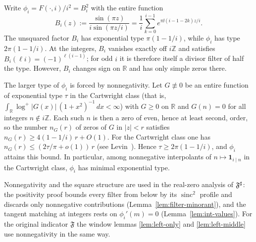 \begin{remark}\label{rem:minimal-type}
Write $\phi_i=F(\cdot,i)/i^2=B_i^2$ with the entire function
\[
B_i(z):=\frac{\sin(\pi z)}{i\sin(\pi z/i)}=\frac1i\sum_{k=0}^{i-1}e^{\pi\ii(i-1-2k)z/i}.
\]
The unsquared factor $B_i$ has exponential type $\pi(1-1/i)$, while $\phi_i$ has type $2\pi(1-1/i)$. At the integers, $B_i$ vanishes exactly off $i\mathbb Z$ and satisfies $B_i(\ell i)=(-1)^{\ell(i-1)}$; for odd $i$ it is therefore itself a divisor filter of half the type. However, $B_i$ changes sign on $\mathbb R$ and has only simple zeros there.

The larger type of $\phi_i$ is forced by nonnegativity. Let $G\not\equiv0$ be an entire function of exponential type $\tau$ in the Cartwright class (that is, $\int_{\mathbb R}\log^+|G(x)|\,(1+x^2)^{-1}\,dx<\infty$) with $G\ge0$ on $\mathbb R$ and $G(n)=0$ for all integers $n\notin i\mathbb Z$. Each such $n$ is then a zero of even, hence at least second, order, so the number $n_G(r)$ of zeros of $G$ in $|z|<r$ satisfies $n_G(r)\ge 4(1-1/i)\,r+O(1)$. For the Cartwright class one has $n_G(r)\le(2\tau/\pi+o(1))\,r$ (see Levin~\cite{levin1996}). Hence $\tau\ge2\pi(1-1/i)$, and $\phi_i$ attains this bound. In particular, among nonnegative interpolants of $n\mapsto\mathbf 1_{i\mid n}$ in the Cartwright class, $\phi_i$ has minimal exponential type.

Nonnegativity and the square structure are used in the real-zero analysis of $\mathfrak F^{\sharp}$: the positivity proof bounds every filter from below by its $\operatorname{sinc}^2$ profile and discards only nonnegative contributions (Lemma~\ref{lem:filter-minorant}), and the tangent matching at integers rests on $\phi_i'(m)=0$ (Lemma~\ref{lem:int-values}). For the original indicator $\mathfrak F$ the window lemmas \ref{lem:left-only} and \ref{lem:left-middle} use nonnegativity in the same way.
\end{remark}



